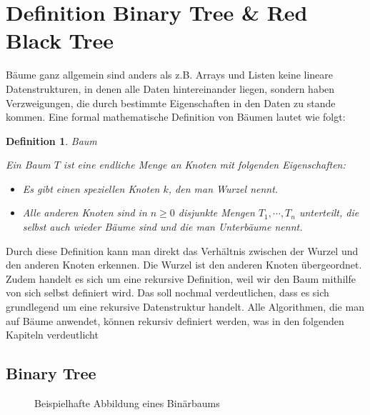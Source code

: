 \documentclass[11pt]{article}
\newtheorem{definition}{Definition}
\begin{document}
\section{Definition Binary Tree \& Red Black Tree} \label{def}

Bäume ganz allgemein sind anders als z.B. Arrays und Listen keine lineare Datenstrukturen, in denen alle Daten hintereinander liegen, sondern haben Verzweigungen, die durch bestimmte Eigenschaften in den Daten zu stande kommen.
Eine formal mathematische Definition von Bäumen lautet wie folgt:

\begin{definition}{Baum} \label{def_bin}
  
Ein Baum $T$ ist eine endliche Menge an Knoten mit folgenden Eigenschaften: 

\begin{itemize}
  \item Es gibt einen speziellen Knoten $k$, den man Wurzel nennt.
  \item Alle anderen Knoten sind in $n \geq 0$ disjunkte Mengen $T_1, \cdots, T_n$ unterteilt, die selbst auch wieder Bäume sind und die man Unterbäume nennt. 
\end{itemize}
\end{definition}

Durch diese Definition kann man direkt das Verhältnis zwischen der Wurzel und den anderen Knoten erkennen. Die Wurzel ist den anderen Knoten übergeordnet. 
Zudem handelt es sich um eine rekursive Definition, weil wir den Baum mithilfe von sich selbst definiert wird.
Das soll nochmal verdeutlichen, dass es sich grundlegend um eine rekursive Datenstruktur handelt. Alle Algorithmen, die man auf Bäume anwendet, können rekursiv definiert werden, was in den folgenden 
Kapiteln verdeutlicht
\cite[S. 308]{aop}

\pagebreak

\subsection{Binary Tree}

\begin{figure}    
    \caption{Beispielhafte Abbildung eines Binärbaums}
    \label{bin_ex}
\end{figure}
\end{document}
